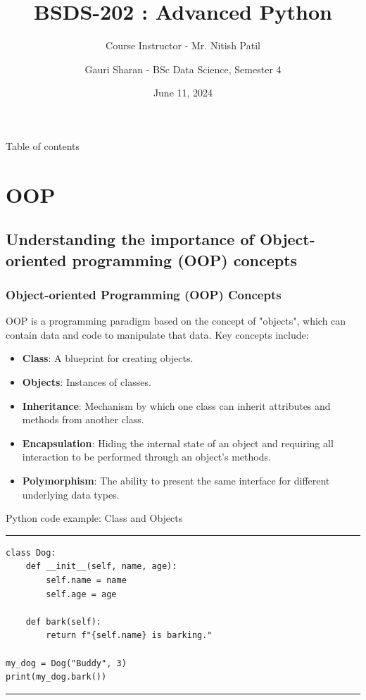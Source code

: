 \documentclass[aspectratio=169, hideothersubsections]{beamer}
\title{BSDS-202 : Advanced Python}
\subtitle{Course Instructor - Mr. Nitish Patil}
\author[Gauri Sharan]{Gauri Sharan - BSc Data Science, Semester 4}
\date{June 11, 2024}
\begin{document}
\frame{\titlepage}

\begin{frame}{Table of contents}
    \tableofcontents[hideallsubsections]
\end{frame}

\section{OOP}

\subsection{Understanding the importance of Object-oriented programming (OOP) concepts}
\begin{frame}
\frametitle{Object-oriented Programming (OOP) Concepts}
OOP is a programming paradigm based on the concept of "objects", which can contain data and code to manipulate that data. Key concepts include:
\begin{itemize}
    \item \textbf{Class}: A blueprint for creating objects.
    \item \textbf{Objects}: Instances of classes.
    \item \textbf{Inheritance}: Mechanism by which one class can inherit attributes and methods from another class.
    \item \textbf{Encapsulation}: Hiding the internal state of an object and requiring all interaction to be performed through an object's methods.
    \item \textbf{Polymorphism}: The ability to present the same interface for different underlying data types.
\end{itemize}
\end{frame}

\begin{frame}[fragile]{Python code example: Class and Objects}
\rule{\textwidth}{1pt}
\scriptsize
\begin{verbatim}
class Dog:
    def __init__(self, name, age):
        self.name = name
        self.age = age

    def bark(self):
        return f"{self.name} is barking."

my_dog = Dog("Buddy", 3)
print(my_dog.bark())
\end{verbatim}
\rule{\textwidth}{1pt}
\end{frame}
\end{document}
